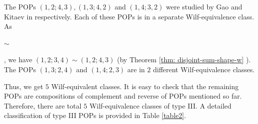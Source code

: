\documentclass[12pt, english, a4paper]{article}
\theoremstyle{plain}
\theoremstyle{definition}
\theoremstyle{remark}
\begin{document}
 The POPs $(1,2;4,3), (1,3;4,2)$ and $(1,4;3,2)$ were studied by Gao and Kitaev in  \cite[Theorem 15,16,18]{gao-kitaev-length-4-5-pops} respectively. Each of these POPs is in a separate Wilf-equivalence class. 
As  $\sim$  , we have $(1,2;3,4) \sim (1,2;4,3)$ (by Theorem \ref{thm: disjoint-sum-shape-w} ).
The POPs $(1,3;2,4)$  and $(1,4;2,3)$  are in $2$ 
different Wilf-equivalence classes.

Thus, we get $5$ Wilf-equivalent classes. It is easy to check that 
the remaining POPs are compositions of complement and reverse of POPs mentioned so far. Therefore, there are total $5$ Wilf-equivalence 
classes of type III. A detailed classification of type III POPs is 
provided in Table \ref{table2}.
\end{document}

